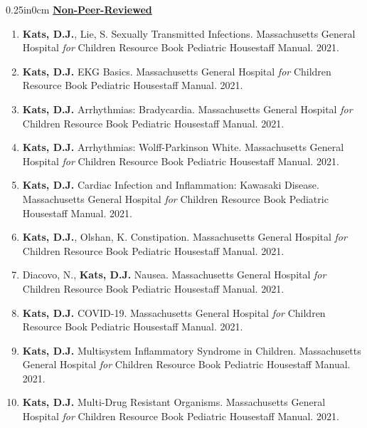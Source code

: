 \documentclass[11pt]{article}
\newcommand{\bibsec}[1]{\underline{\normalsize\bfseries#1}}
\newcommand{\blockindent}{0.25in}
\begin{document}
\begin{adjustwidth}{\blockindent}{0cm}
\bibsec{Non-Peer-Reviewed}

	\begin{enumerate}[resume]

		\item\label{rainbow-sti} \textbf{Kats, D.J.}, Lie, S. Sexually Transmitted Infections. Massachusetts General Hospital \textit{for} Children Resource Book Pediatric Housestaff Manual. 2021.

		\item\label{rainbow-ekg} \textbf{Kats, D.J.} EKG Basics. Massachusetts General Hospital \textit{for} Children Resource Book Pediatric Housestaff Manual. 2021.

		\item\label{rainbow-bradycardia} \textbf{Kats, D.J.} Arrhythmias: Bradycardia. Massachusetts General Hospital \textit{for} Children Resource Book Pediatric Housestaff Manual. 2021.

		\item\label{rainbow-wpw} \textbf{Kats, D.J.} Arrhythmias: Wolff-Parkinson White. Massachusetts General Hospital \textit{for} Children Resource Book Pediatric Housestaff Manual. 2021.

		\item\label{rainbow-kawasaki} \textbf{Kats, D.J.} Cardiac Infection and Inflammation: Kawasaki Disease. Massachusetts General Hospital \textit{for} Children Resource Book Pediatric Housestaff Manual. 2021.

		\item\label{rainbow-constipation} \textbf{Kats, D.J.}, Olshan, K. Constipation. Massachusetts General Hospital \textit{for} Children Resource Book Pediatric Housestaff Manual. 2021.

		\item\label{rainbow-nausea} Diacovo, N., \textbf{Kats, D.J.} Nausea. Massachusetts General Hospital \textit{for} Children Resource Book Pediatric Housestaff Manual. 2021.

		\item\label{rainbow-covid19} \textbf{Kats, D.J.} COVID-19. Massachusetts General Hospital \textit{for} Children Resource Book Pediatric Housestaff Manual. 2021.

		\item\label{rainbow-misc} \textbf{Kats, D.J.} Multisystem Inflammatory Syndrome in Children. Massachusetts General Hospital \textit{for} Children Resource Book Pediatric Housestaff Manual. 2021.

		\item\label{rainbow-mdro} \textbf{Kats, D.J.} Multi-Drug Resistant Organisms. Massachusetts General Hospital \textit{for} Children Resource Book Pediatric Housestaff Manual. 2021.


\end{enumerate}
\end{adjustwidth}
\end{document}
